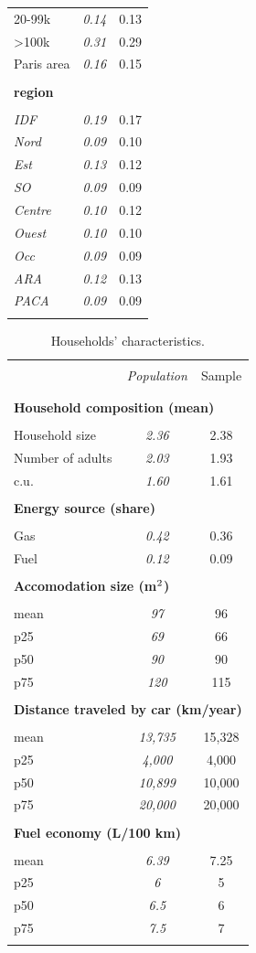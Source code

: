 \documentclass[english,5p,authoryear]{elsarticle}
\begin{document}
\begin{appendices}
\begin{table}[!htbp]
\begin{tabular}{lcc}
20-99k & \textit{0.14} & 0.13\tabularnewline
>100k & \textit{0.31} & 0.29\tabularnewline
Paris area & \textit{0.16} & 0.15\tabularnewline
\hline  \\[-1.8ex]
\textbf{region} &  & \tabularnewline  \\[-1.8ex]
\textit{IDF} & \textit{0.19} & 0.17\tabularnewline
 \textit{Nord} & \textit{0.09} & 0.10\tabularnewline
 \textit{Est} & \textit{0.13} & 0.12\tabularnewline
\textit{SO} & \textit{0.09} & 0.09\tabularnewline
\textit{Centre} & \textit{0.10} & 0.12\tabularnewline
 \textit{Ouest} & \textit{0.10} & 0.10\tabularnewline
 \textit{Occ} & \textit{0.09} & 0.09\tabularnewline
\textit{ARA} & \textit{0.12} & 0.13\tabularnewline
\textit{PACA} & \textit{0.09} & 0.09\tabularnewline  \\[-1.8ex]
\hline \hline 
\end{tabular}\bigskip{}
\end{table}


\begin{table}[!htbp]
    \caption{Households' characteristics.\label{tab:app-energetic-characs}}
\centering
\begin{tabular}{lcc}
\hline \hline  \\[-1.8ex]
 & \textit{Population} & Sample  \tabularnewline \\[-1.8ex]
\hline  \\[-1.8ex]
\multicolumn{3}{l}{\textbf{Household composition (mean)}} \tabularnewline  \\[-1.8ex]
Household size & \textit{2.36} & 2.38\tabularnewline
Number of adults & \textit{2.03} & 1.93\tabularnewline
c.u. & \textit{1.60} & 1.61\tabularnewline
\hline   \\[-1.8ex]
\multicolumn{3}{l}{\textbf{Energy source (share)}} \tabularnewline  \\[-1.8ex]
Gas & \textit{0.42} & 0.36\tabularnewline
Fuel & \textit{0.12} & 0.09\tabularnewline
\hline   \\[-1.8ex]
\multicolumn{3}{l}{\textbf{Accomodation size (m$^\textnormal{2}$)}} \tabularnewline  \\[-1.8ex]
mean & \textit{97} & 96\tabularnewline
p25 & \textit{69} & 66\tabularnewline
p50 & \textit{90} & 90\tabularnewline
p75 & \textit{120} & 115\tabularnewline
\hline   \\[-1.8ex]
\multicolumn{3}{l}{\textbf{Distance traveled by car (km/year)}} \tabularnewline  \\[-1.8ex]
mean & \textit{13,735} & 15,328\tabularnewline
p25 & \textit{4,000} & 4,000\tabularnewline
p50 & \textit{10,899} & 10,000 \tabularnewline
p75 & \textit{20,000 } & 20,000 \tabularnewline
\hline   \\[-1.8ex]
\multicolumn{3}{l}{\textbf{Fuel economy (L/100 km)}} \tabularnewline  \\[-1.8ex]
mean & \textit{6.39} & 7.25\tabularnewline
p25 & \textit{6} & 5\tabularnewline
p50 & \textit{6.5} & 6\tabularnewline
p75 & \textit{7.5} & 7\tabularnewline  \\[-1.8ex]
\hline \hline 
\end{tabular}\bigskip{}


\end{table}
\end{appendices}
\end{document}
